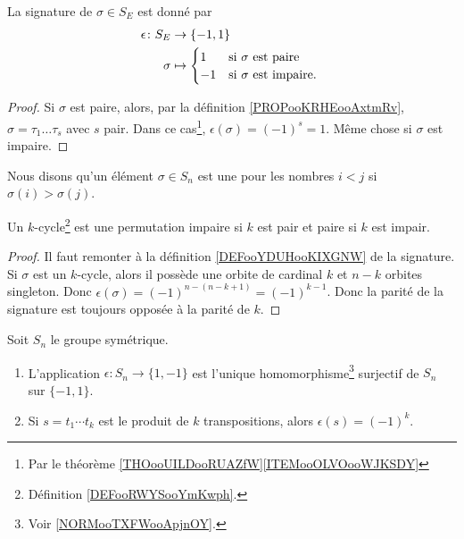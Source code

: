 \begin{proposition}       \label{PROPooXIQOooCcoekP}
	La signature de \( \sigma\in S_E\) est donné par
	\begin{equation}
		\begin{aligned}
			\epsilon\colon S_E & \to \{ -1,1 \}                                   \\
			\sigma             & \mapsto \begin{cases}
				                             1  & \text{si \( \sigma\) est paire }    \\
				                             -1 & \text{si \( \sigma\) est impaire. }
			                             \end{cases}
		\end{aligned}
	\end{equation}
\end{proposition}

\begin{proof}
	Si \( \sigma\) est paire, alors, par la définition \ref{PROPooKRHEooAxtmRv}, \( \sigma=\tau_1\ldots\tau_s\) avec \( s\) pair. Dans ce cas\footnote{Par le théorème \ref{THOooUILDooRUAZfW}\ref{ITEMooOLVOooWJKSDY}}, \( \epsilon(\sigma)=(-1)^s=1\). Même chose si \( \sigma\) est impaire.
\end{proof}


\begin{definition}	\label{DEFooPXIVooXyYKAH}
	Nous disons qu'un élément \( \sigma \in S_n\) est une  pour les nombres \( i<j\) si \( \sigma(i)>\sigma(j)\).
\end{definition}


\begin{lemma}       \label{LemhxnkMf}
	Un \( k\)-cycle\footnote{Définition \ref{DEFooRWYSooYmKwph}.} est une permutation impaire si \( k\) est pair et paire si \( k\) est impair.
\end{lemma}

\begin{proof}
	Il faut remonter à la définition \ref{DEFooYDUHooKIXGNW} de la signature. Si \( \sigma\) est un \( k\)-cycle, alors il possède une orbite de cardinal \( k\) et \( n-k\) orbites singleton. Donc \( \epsilon(\sigma)=(-1)^{n-(n-k+1)}=(-1)^{k-1}\). Donc la parité de la signature est toujours opposée à la parité de \( k\).
\end{proof}

\begin{proposition}  \label{ProphIuJrC}
	Soit \( S_n\) le groupe symétrique.
	\begin{enumerate}
		\item       \label{ITEMooBQKUooFTkvSu}
		      L'application \( \epsilon\colon S_n\to \{ 1,-1 \}\) est l'unique homomorphisme\footnote{Voir \ref{NORMooTXFWooApjnOY}.} surjectif de \( S_n\) sur \( \{ -1,1 \}\).
		\item
		      Si \( s=t_1\cdots t_k\) est le produit de \( k\) transpositions, alors \( \epsilon(s)=(-1)^k\).
	\end{enumerate}
\end{proposition}


